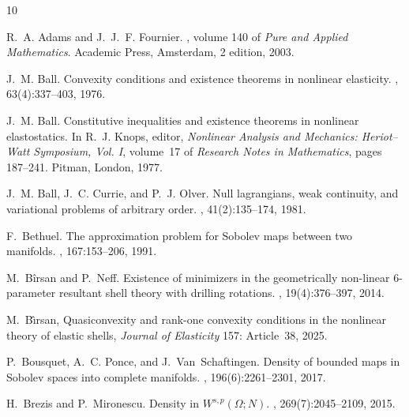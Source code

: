 \documentclass[11pt]{article}
\begin{document}
\begin{footnotesize}
 
 
\begin{thebibliography}{10}

R.~A. Adams and J.~J.~F. Fournier.
, volume 140 of {\em Pure and Applied
  Mathematics}.
\newblock Academic Press, Amsterdam, 2 edition, 2003.

J.~M. Ball.
\newblock Convexity conditions and existence theorems in nonlinear elasticity.
, 63(4):337--403,
  1976.

J.~M. Ball.
\newblock Constitutive inequalities and existence theorems in nonlinear
  elastostatics.
\newblock In R.~J. Knops, editor, {\em Nonlinear Analysis and Mechanics:
  Heriot--Watt Symposium, Vol. I}, volume~17 of {\em Research Notes in
  Mathematics}, pages 187--241. Pitman, London, 1977.

J.~M. Ball, J.~C. Currie, and P.~J. Olver.
\newblock Null lagrangians, weak continuity, and variational problems of
  arbitrary order.
, 41(2):135--174, 1981.

F.~Bethuel.
\newblock The approximation problem for {Sobolev} maps between two manifolds.
, 167:153--206, 1991.

M.~B\^{i}rsan and P.~Neff.
\newblock Existence of minimizers in the geometrically non-linear 6-parameter
  resultant shell theory with drilling rotations.
, 19(4):376--397, 2014.



 M.~B{\^{\i}}rsan, \newblock Quasiconvexity and rank-one convexity conditions in the nonlinear theory of elastic shells, \newblock \emph{Journal of Elasticity}  {157}: Article~38, 2025. 

P.~Bousquet, A.~C. Ponce, and J.~Van~Schaftingen.
\newblock Density of bounded maps in {Sobolev} spaces into complete manifolds.
,
  196(6):2261--2301, 2017.

H.~Brezis and P.~Mironescu.
\newblock Density in ${W}^{s, p} ({\Omega}; {N})$.
, 269(7):2045--2109, 2015.


\end{thebibliography}
\end{footnotesize}
\end{document}
